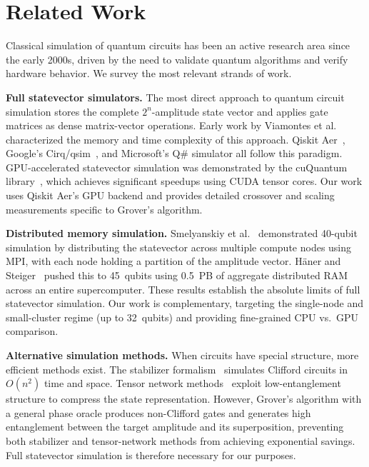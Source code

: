 \documentclass[sigconf, authorversion, nonacm]{acmart}
\begin{document}
\section{Related Work}

Classical simulation of quantum circuits has been an active research area since the early 2000s, driven by the need to validate quantum algorithms and verify hardware behavior. We survey the most relevant strands of work.

\textbf{Full statevector simulators.} The most direct approach to quantum circuit simulation stores the complete $2^n$-amplitude state vector and applies gate matrices as dense matrix-vector operations. Early work by Viamontes et al.~\cite{Viamontes2003} characterized the memory and time complexity of this approach. Qiskit Aer~\cite{Qiskit}, Google's Cirq/qsim~\cite{qsim}, and Microsoft's Q\# simulator all follow this paradigm. GPU-accelerated statevector simulation was demonstrated by the cuQuantum library~\cite{cuQuantum}, which achieves significant speedups using CUDA tensor cores. Our work uses Qiskit Aer's GPU backend and provides detailed crossover and scaling measurements specific to Grover's algorithm.

\begingroup\emergencystretch=3pt
\textbf{Distributed memory simulation.} Smelyanskiy et al.~\cite{Smelyanskiy2016} demonstrated 40-qubit simulation by distributing the statevector across multiple compute nodes using MPI, with each node holding a partition of the amplitude vector. H\"{a}ner and Steiger~\cite{Haener2017} pushed this to 45~qubits using 0.5~PB of aggregate distributed RAM across an entire supercomputer. These results establish the absolute limits of full statevector simulation. Our work is complementary, targeting the single-node and small-cluster regime (up to 32~qubits) and providing fine-grained CPU vs.\ GPU comparison.
\endgroup

\textbf{Alternative simulation methods.} When circuits have special structure, more efficient methods exist. The stabilizer formalism~\cite{Gottesman1998} simulates Clifford circuits in $O(n^2)$ time and space. Tensor network methods~\cite{Markov2008} exploit low-entanglement structure to compress the state representation. However, Grover's algorithm with a general phase oracle produces non-Clifford gates and generates high entanglement between the target amplitude and its superposition, preventing both stabilizer and tensor-network methods from achieving exponential savings. Full statevector simulation is therefore necessary for our purposes.
\end{document}
